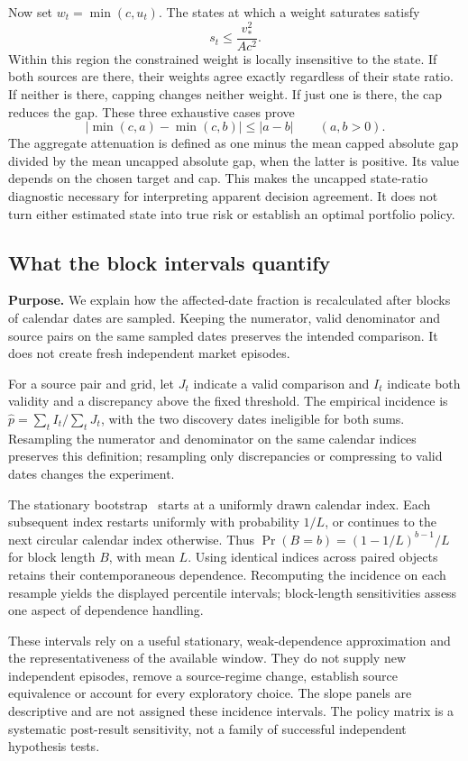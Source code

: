 Now set $w_t=\min(c,u_t)$. The states at which a weight saturates satisfy
\begin{equation}
 s_t\leq\frac{v_*^2}{A c^2}.
\end{equation}
Within this region the constrained weight is locally insensitive to the state. If both sources are there, their weights agree exactly regardless of their state ratio. If neither is there, capping changes neither weight. If just one is there, the cap reduces the gap. These three exhaustive cases prove
\begin{equation}
 |\min(c,a)-\min(c,b)|\leq |a-b|\qquad(a,b>0).
\end{equation}
The aggregate attenuation is defined as one minus the mean capped absolute gap divided by the mean uncapped absolute gap, when the latter is positive. Its value depends on the chosen target and cap. This makes the uncapped state-ratio diagnostic necessary for interpreting apparent decision agreement. It does not turn either estimated state into true risk or establish an optimal portfolio policy.

\subsection{What the block intervals quantify}\label{app:resampling}
\textbf{Purpose.} We explain how the affected-date fraction is recalculated after blocks of calendar dates are sampled. Keeping the numerator, valid denominator and source pairs on the same sampled dates preserves the intended comparison. It does not create fresh independent market episodes.

For a source pair and grid, let $J_t$ indicate a valid comparison and $I_t$ indicate both validity and a discrepancy above the fixed threshold. The empirical incidence is $\widehat p=\sum_t I_t/\sum_t J_t$, with the two discovery dates ineligible for both sums. Resampling the numerator and denominator on the same calendar indices preserves this definition; resampling only discrepancies or compressing to valid dates changes the experiment.

The stationary bootstrap~\cite{politis} starts at a uniformly drawn calendar index. Each subsequent index restarts uniformly with probability $1/L$, or continues to the next circular calendar index otherwise. Thus $\Pr(B=b)=(1-1/L)^{b-1}/L$ for block length $B$, with mean $L$. Using identical indices across paired objects retains their contemporaneous dependence. Recomputing the incidence on each resample yields the displayed percentile intervals; block-length sensitivities assess one aspect of dependence handling.

These intervals rely on a useful stationary, weak-dependence approximation and the representativeness of the available window. They do not supply new independent episodes, remove a source-regime change, establish source equivalence or account for every exploratory choice. The slope panels are descriptive and are not assigned these incidence intervals. The policy matrix is a systematic post-result sensitivity, not a family of successful independent hypothesis tests.
